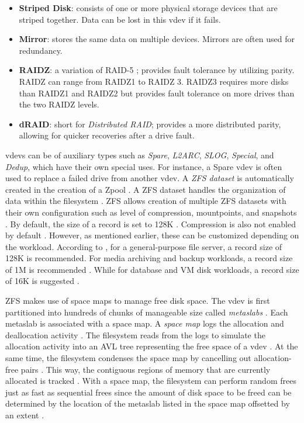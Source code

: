 \begin{itemize}
	\item \textbf{Striped Disk}: consists of one or more physical storage devices that are striped together. Data can be
	      lost in this vdev if it fails.

	\item \textbf{Mirror}: stores the same data on multiple devices. Mirrors are often used for redundancy.

	\item \textbf{RAIDZ}: a variation of RAID-5 \parencite{openzfs_raidz}; provides fault tolerance by utilizing parity.
	      RAIDZ can range from RAIDZ1 to RAIDZ 3. RAIDZ3 requires more disks than RAIDZ1 and RAIDZ2 but provides fault tolerance
	      on more drives than the two RAIDZ levels.

	\item \textbf{dRAID}: short for \textit{Distributed RAID}; provides a more distributed parity, allowing for quicker
	      recoveries after a drive fault.
\end{itemize}

\noindent
vdevs can be of auxiliary types such as \textit{Spare}, \textit{L2ARC}, \textit{SLOG}, \textit{Special}, and \textit{Dedup},
which have their own special uses. For instance, a Spare vdev is often used to replace a failed drive from another vdev.
A \textit{ZFS dataset} is automatically created in the creation of a Zpool \parencite{pasek2025}. A ZFS dataset handles
the organization of data within the filesystem \parencite{45drives}. ZFS allows creation of multiple ZFS datasets with
their own configuration such as level of compression, mountpoints, and snapshots \parencite{pasek2025}. By default,
the size of a record is set to 128K \parencite{pasek2025}. Compression is also not enabled by default \parencite{pasek2025}.
However, as mentioned earlier, these can be customized depending on the workload. According to \textcite{pasek2025},
for a general-purpose file server, a record size of 128K is recommended. For media archiving and backup workloads,
a record size of 1M is recommended \parencite{pasek2025}. While for database and VM disk workloads, a record size
of 16K is suggested \parencite{pasek2025}.

ZFS makes use of space maps to manage free disk space. The vdev is first partitioned into hundreds of chunks of
manageable size called \textit{metaslabs} \parencite{david2012}. Each metaslab is associated with a space map. A
\textit{space map} logs the allocation and deallocation activity \parencite{david2012}. The filesystem reads from
the logs to simulate the allocation activity into an AVL tree representing the free space of a vdev \parencite{david2012}.
At the same time, the filesystem condenses the space map by cancelling out allocation-free pairs \parencite{david2012}.
This way, the contiguous regions of memory that are currently allocated is tracked \parencite{siebenmann2015}.
With a space map, the filesystem can perform random frees just as fast as sequential frees since the amount of disk
space to be freed can be determined by the location of the metaslab listed in the space map offsetted by an extent
\parencite{david2012}.

